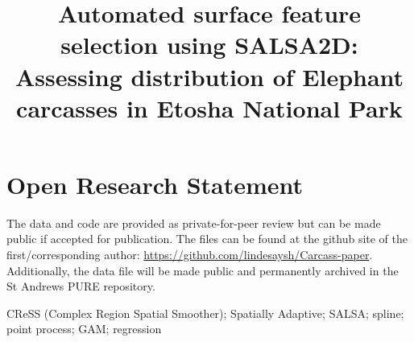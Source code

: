 \documentclass[letterpaper, 12pt]{interact}
\begin{document}
	\title{Automated surface feature selection using SALSA2D: Assessing 
		distribution of Elephant carcasses in Etosha National Park}
	
	\author{
	}
	
	
	
	\maketitle %
	
	\vspace{1cm}
	
	\section*{Open Research Statement}
	The data and code are provided as private-for-peer review but can be made public if accepted for publication.  The files can be found at the github site of the first/corresponding author: \url{https://github.com/lindesaysh/Carcass-paper}. Additionally, the data file will be made public and permanently archived in the St Andrews PURE repository.
	
	\begin{keywords}
		CReSS (Complex Region Spatial Smoother); Spatially Adaptive; SALSA; spline; point process; GAM; regression
	\end{keywords}
	
\end{document}
